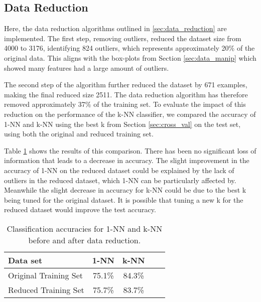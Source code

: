 \documentclass{article}
\theoremstyle{plain}
\theoremstyle{definition}
\theoremstyle{remark}
\begin{document}
\subsection{Data Reduction}
    Here, the data reduction algorithms outlined in \ref{sec:data_reduction} are implemented. The first step, removing outliers, reduced the dataset size from 4000 to 3176, identifying 824 outliers, which represents approximately 20\% of the original data. This aligns with the box-plots from Section \ref{sec:data_manip} which showed many features had a large amount of outliers.

    The second step of the algorithm further reduced the dataset by 671 examples, making the final reduced size 2511. The data reduction algorithm has therefore removed approximately 37\% of the training set. To evaluate the impact of this reduction on the performance of the k-NN classifier, we compared the accuracy of 1-NN and k-NN using the best k from Section \ref{sec:cross_val} on the test set, using both the original and reduced training set.

    Table \ref{reduction-table} shows the results of this comparison. There has been no significant loss of information that leads to a decrease in accuracy. The slight improvement in the accuracy of 1-NN on the reduced dataset could be explained by the lack of outliers in the reduced dataset, which 1-NN can be particularly affected by. Meanwhile the slight decrease in accuracy for k-NN could be due to the best k being tuned for the original dataset. It is possible that tuning a new k for the reduced dataset would improve the test accuracy.

    \begin{table}[t]
    \label{reduction-table}
    \vskip 0.15in
    \begin{center}
    \begin{small}
    \begin{sc}
    \begin{tabular}{lcccr}
    \toprule
    Data set & 1-NN & k-NN \\
    \midrule
    Original Training Set  & 75.1\% & 84.3\%  \\
    Reduced Training Set   & 75.7\% & 83.7\%  \\
    \bottomrule
    \end{tabular}
    \end{sc}
    \end{small}
    \end{center}
    \caption{Classification accuracies for 1-NN and k-NN before and after data reduction.}
    \vskip -0.1in
    \end{table}
\end{document}
